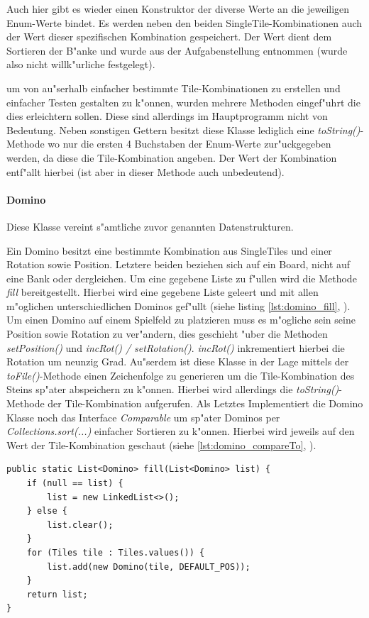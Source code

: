 Auch hier gibt es wieder einen Konstruktor der diverse Werte an die jeweiligen Enum-Werte bindet. Es werden neben den beiden SingleTile-Kombinationen auch der Wert dieser spezifischen Kombination gespeichert. Der Wert dient dem Sortieren der B"anke und wurde aus der Aufgabenstellung entnommen (wurde also nicht willk"urliche festgelegt). 

um von au"serhalb einfacher bestimmte Tile-Kombinationen zu erstellen und einfacher Testen gestalten zu k"onnen, wurden mehrere Methoden eingef"uhrt die dies erleichtern sollen. Diese sind allerdings im Hauptprogramm nicht von Bedeutung. Neben sonstigen Gettern besitzt diese Klasse lediglich eine \emph{toString()}-Methode wo nur die ersten 4 Buchstaben der Enum-Werte zur"uckgegeben werden, da diese die Tile-Kombination angeben. Der Wert der Kombination entf"allt hierbei (ist aber in dieser Methode auch unbedeutend).

\paragraph{Domino}
\label{par:domino}
Diese Klasse vereint s"amtliche zuvor genannten Datenstrukturen. 

Ein Domino besitzt eine bestimmte Kombination aus SingleTiles und einer Rotation sowie Position. Letztere beiden beziehen sich auf ein Board, nicht auf eine Bank oder dergleichen. Um eine gegebene Liste zu f"ullen wird die Methode \emph{fill} bereitgestellt. Hierbei wird eine gegebene Liste geleert und mit allen m"oglichen unterschiedlichen Dominos gef"ullt (siehe listing \ref{lst:domino_fill}, ). Um einen Domino auf einem Spielfeld zu platzieren muss es m"ogliche sein seine Position sowie Rotation zu ver"andern, dies geschieht "uber die Methoden \emph{setPosition()} und \emph{incRot() / setRotation()}. \emph{incRot()} inkrementiert hierbei die Rotation um neunzig Grad. Au"serdem ist diese Klasse in der Lage mittels der \emph{toFile()}-Methode einen Zeichenfolge zu generieren um die Tile-Kombination des Steins sp"ater abspeichern zu k"onnen. Hierbei wird allerdings die \emph{toString()}-Methode der Tile-Kombination aufgerufen. Als Letztes Implementiert die Domino Klasse noch das Interface \emph{Comparable} um sp"ater Dominos per \emph{Collections.sort(...)} einfacher Sortieren zu k"onnen. Hierbei wird jeweils auf den Wert der Tile-Kombination geschaut (siehe \ref{lst:domino_compareTo}, ). 

\begin{lstlisting}[float,style=CodeHighlighting,caption=Domino - fill,label=lst:domino_fill]
public static List<Domino> fill(List<Domino> list) {
    if (null == list) {
        list = new LinkedList<>();
    } else {
        list.clear();
    }
    for (Tiles tile : Tiles.values()) {
        list.add(new Domino(tile, DEFAULT_POS));
    }
    return list;
}
\end{lstlisting}

